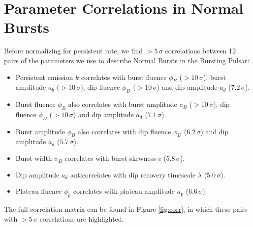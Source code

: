 \chapter{Parameter Correlations in Normal Bursts}
\label{app:corr}

\par Before normalizing for persistent rate, we find $>5\,\sigma$ correlations between 12 pairs of the parameters we use to describe Normal Bursts in the Bursting Pulsar:

\begin{itemize}
\item Persistent emission $k$ correlates with burst fluence $\phi_B$ ($>10\,\sigma$), burst amplitude $a_b$ ($>10\,\sigma$), dip fluence $\phi_D$ ($>10\,\sigma$) and dip amplitude $a_d$ ($7.2\,\sigma$).
\item Burst fluence $\phi_B$ also correlates with burst amplitude $a_B$ ($>10\,\sigma$), dip fluence $\phi_D$ ($>10\,\sigma$) and dip amplitude $a_d$ ($7.1\,\sigma$).
\item Burst amplitude $\phi_B$ also correlates with dip fluence $\phi_D$ ($6.2\,\sigma$) and dip amplitude $a_d$ ($5.7\,\sigma$).
\item Burst width $\sigma_B$ correlates with burst skewness $c$ ($5.8\,\sigma$).
\item Dip amplitude $a_d$ anticorrelates with dip recovery timescale $\lambda$ ($5.0\,\sigma$).
\item Plateau fluence $\phi_p$ correlates with plateau amplitude $a_p$ ($6.6\,\sigma$).
\end{itemize}

The full correlation matrix can be found in Figure \ref{fig:corr}, in which these pairs with $>5\,\sigma$ correlations are highlighted.
